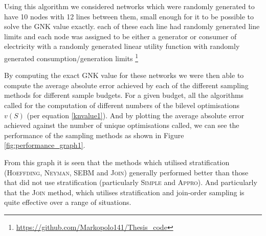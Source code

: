 Using this algorithm we considered networks which were randomly generated to have 10 nodes with 12 lines between them, \DIFdelbegin {}\DIFdelend \DIFaddbegin {}\DIFaddend small enough for it to be possible to solve the GNK value exactly.
\DIFdelbegin {}\DIFdelend \DIFaddbegin {}\DIFaddend each of these \DIFdelbegin {}\DIFdelend \DIFaddbegin {}\DIFaddend each line had randomly generated line limits \DIFaddbegin {}\DIFaddend and each node was \DIFaddbegin {}\DIFaddend assigned to be either a generator or consumer of electricity \DIFdelbegin {}\DIFdelend \DIFaddbegin {}\DIFaddend with a randomly generated linear utility function \DIFaddbegin {}\DIFaddend with randomly generated consumption/generation limits \DIFdelbegin {}\DIFdelend \DIFaddbegin {}\footnote{\href{https://github.com/Markopolo141/Thesis\_code}{https://github.com/Markopolo141/Thesis\_code}}
\DIFaddend 

By computing the exact GNK value for these networks we were then able to compute the average absolute error achieved by each of the different sampling methods for different sample budgets.
For a given budget, all the algorithms called for the computation of different numbers of the bilevel optimisations $v(S)$ (per equation \ref{knvalue1}).
And by plotting the average absolute error achieved against the number of unique optimisations called, we can see the performance of the sampling methods as shown in Figure \ref{fig:performance_graph1}.

From this graph it is seen that the methods which utilised stratification (\textsc{Hoeffding}, \textsc{Neyman}, \textsc{SEBM} and \textsc{Join})  generally performed better than those that did not use stratification (particularly \textsc{Simple} and \textsc{Appro}).
And particularly that the \textsc{Join} method, which utilises stratification and join-order sampling is quite effective over a range of situations.

